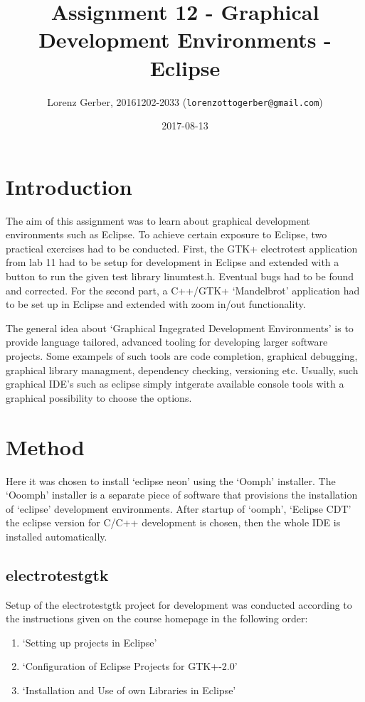 \documentclass[a4paper,11pt,twoside]{article}
\title{Assignment 12 - Graphical Development Environments - Eclipse }
\author{Lorenz Gerber, 20161202-2033 ({\tt{lorenzottogerber@gmail.com}})}
\date{2017-08-13}
\begin{document}
\lstset{language=C}
\maketitle
\thispagestyle{empty}
\newpage

\clearpage
{}

\section{Introduction} The aim of this assignment was to learn about graphical
development environments such as Eclipse. To achieve certain exposure to
Eclipse, two practical exercises had to be conducted. First, the GTK+
electrotest application from lab 11 had to be setup for development in Eclipse
and extended with a button to run the given test library linumtest.h. Eventual
bugs had to be found and corrected. For the second part, a C++/GTK+ `Mandelbrot'
application had to be set up in Eclipse and extended with zoom in/out
functionality.

The general idea about `Graphical Ingegrated Development Environments' is to
provide language tailored, advanced tooling for developing larger software
projects. Some exampels of such tools are code completion, graphical debugging,
graphical library managment, dependency checking, versioning etc. Usually, such
graphical IDE's such as eclipse simply intgerate available console tools with a
graphical possibility to choose the options.

\section{Method}
Here it was chosen to install `eclipse neon' using the `Oomph' installer. The `Ooomph'
installer is a separate piece of software that provisions the installation of
`eclipse' development environments. After startup of `oomph', `Eclipse CDT' the
eclipse version for C/C++ development is chosen, then the whole IDE is installed
automatically.

\subsection{electrotestgtk}
Setup of the electrotestgtk project for development was conducted according to the
instructions given on the course homepage in the following order:
\begin{enumerate}
  \item `Setting up projects in Eclipse'
  \item `Configuration of Eclipse Projects for GTK+-2.0'
  \item `Installation and Use of own Libraries in Eclipse'
\end{enumerate}
\end{document}
